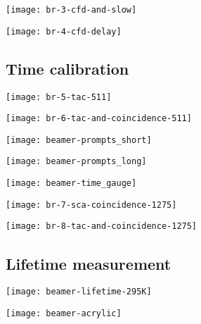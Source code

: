 \documentclass[english, fleqn]{beamer}
\newcommand\oscillatorSize{0.7}
\begin{document}
\begin{frame}
    \texttt{[image: br-3-cfd-and-slow]}
\end{frame}


\begin{frame}
    \texttt{[image: br-4-cfd-delay]}
\end{frame}


\subsection{Time calibration}

\begin{frame}
    \texttt{[image: br-5-tac-511]}
\end{frame}


\begin{frame}
    \texttt{[image: br-6-tac-and-coincidence-511]}
\end{frame}


\begin{frame}
    \texttt{[image: beamer-prompts\_short]}
\end{frame}


\begin{frame}
    \texttt{[image: beamer-prompts\_long]}
\end{frame}


\begin{frame}
    \texttt{[image: beamer-time\_gauge]}
\end{frame}


\begin{frame}
    \texttt{[image: br-7-sca-coincidence-1275]}
\end{frame}


\begin{frame}
    \texttt{[image: br-8-tac-and-coincidence-1275]}
\end{frame}


\subsection{Lifetime measurement}

\begin{frame}
    \texttt{[image: beamer-lifetime-295K]}
\end{frame}


\begin{frame}
    \texttt{[image: beamer-acrylic]}
\end{frame}
\end{document}
